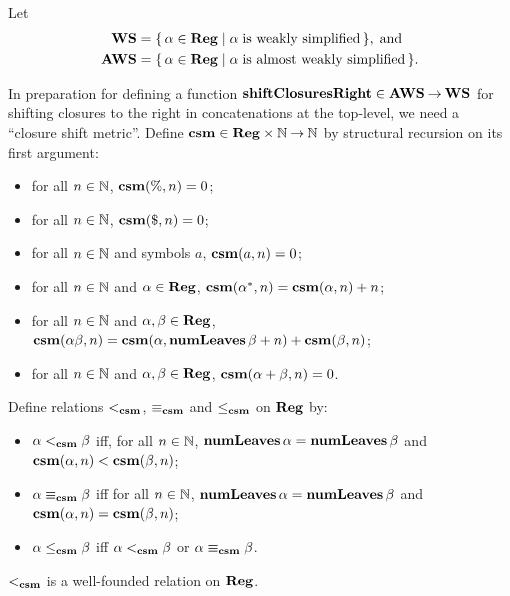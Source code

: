 Let
\begin{align*}
  \mathbf{WS} &= \{ \, \alpha\in\mathbf{Reg} \mid \alpha\;\allowbreak\mbox{is weakly simplified}\allowbreak \, \},
  \;\allowbreak\mbox{and}\allowbreak\; \\
  \mathbf{AWS} &= \{ \, \alpha\in\mathbf{Reg} \mid \alpha\;\allowbreak\mbox{is almost weakly simplified}\allowbreak \, \} .
\end{align*}

In preparation for defining a function
$\mathbf{shiftClosuresRight}\in\mathbf{AWS}\mathbin{\to}\mathbf{WS}$ for shifting closures to the right
in concatenations at the top-level, we need a ``closure shift
metric''. Define $\mathbf{csm}\in\mathbf{Reg}\times\mathbb{N}\mathbin{\to}\mathbb{N}$ by structural
recursion on its first argument:
\begin{itemize}
\item for all $n\in\mathbb{N}$, $\mathbf{csm}(\%, n) = 0$;

\item for all $n\in\mathbb{N}$, $\mathbf{csm}(\$, n) = 0$;

\item for all $n\in\mathbb{N}$ and symbols $a$, $\mathbf{csm}(a, n) = 0$;

\item for all $n\in\mathbb{N}$ and $\alpha\in\mathbf{Reg}$,
  $\mathbf{csm}(\alpha^*, n) = \mathbf{csm}(\alpha, n) + n$;

\item for all $n\in\mathbb{N}$ and $\alpha,\beta\in\mathbf{Reg}$,
  $\mathbf{csm}(\alpha\beta, n) = \mathbf{csm}(\alpha, \mathbf{numLeaves}\,\beta + n) +
  \mathbf{csm}(\beta, n)$;

\item for all $n\in\mathbb{N}$ and $\alpha, \beta\in\mathbf{Reg}$,
  $\mathbf{csm}(\alpha+\beta, n) = 0$.
\end{itemize}

Define relations $\mathrel{<_{\mathbf{csm}}}$, $\mathrel{\equiv_{\mathbf{csm}}}$ and $\mathrel{\leq_{\mathbf{csm}}}$
on $\mathbf{Reg}$ by:
\begin{itemize}
\item $\alpha\mathrel{<_{\mathbf{csm}}}\beta$ iff, for all $n\in\mathbb{N}$,
  $\mathbf{numLeaves}\,\alpha = \mathbf{numLeaves}\,\beta$ and
  $\mathbf{csm}(\alpha, n) < \mathbf{csm}(\beta, n)$;

\item $\alpha\mathrel{\equiv_{\mathbf{csm}}}\beta$ iff for all $n\in\mathbb{N}$,
  $\mathbf{numLeaves}\,\alpha = \mathbf{numLeaves}\,\beta$ and
  $\mathbf{csm}(\alpha, n) = \mathbf{csm}(\beta, n)$;

\item $\alpha\mathrel{\leq_{\mathbf{csm}}}\beta$ iff $\alpha\mathrel{<_{\mathbf{csm}}}\beta$ or
  $\alpha\mathrel{\equiv_{\mathbf{csm}}}\beta$.
\end{itemize}

\begin{lemma}
\label{CSMWF}
$\mathrel{<_{\mathbf{csm}}}$ is a well-founded relation on $\mathbf{Reg}$.
\end{lemma}


